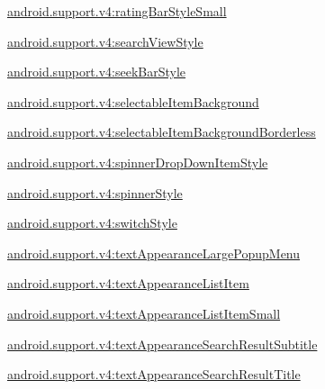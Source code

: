 {\ttfamily \hyperlink{classandroid_1_1support_1_1v4_1_1R_1_1styleable_a82003426a43aa180e41d2b25450047c9}{android.\+support.\+v4\+:rating\+Bar\+Style\+Small}}

{\ttfamily \hyperlink{classandroid_1_1support_1_1v4_1_1R_1_1styleable_ad107185a80adbb1be528d21aa3a5e644}{android.\+support.\+v4\+:search\+View\+Style}}

{\ttfamily \hyperlink{classandroid_1_1support_1_1v4_1_1R_1_1styleable_ac401ab56daa8fcd20c0beb0413d8813f}{android.\+support.\+v4\+:seek\+Bar\+Style}}

{\ttfamily \hyperlink{classandroid_1_1support_1_1v4_1_1R_1_1styleable_a3e75027080282e399085b17ac981b5be}{android.\+support.\+v4\+:selectable\+Item\+Background}}

{\ttfamily \hyperlink{classandroid_1_1support_1_1v4_1_1R_1_1styleable_aabd8d4f3de97874973f63a4e93a5fd9a}{android.\+support.\+v4\+:selectable\+Item\+Background\+Borderless}}

{\ttfamily \hyperlink{classandroid_1_1support_1_1v4_1_1R_1_1styleable_a0aa97271d74700457071ff210723f1c6}{android.\+support.\+v4\+:spinner\+Drop\+Down\+Item\+Style}}

{\ttfamily \hyperlink{classandroid_1_1support_1_1v4_1_1R_1_1styleable_aeba225a2c69936da0d94609f5e139e48}{android.\+support.\+v4\+:spinner\+Style}}

{\ttfamily \hyperlink{classandroid_1_1support_1_1v4_1_1R_1_1styleable_a88c6ebdb5e64556c13f05c1525c8ef99}{android.\+support.\+v4\+:switch\+Style}}

{\ttfamily \hyperlink{classandroid_1_1support_1_1v4_1_1R_1_1styleable_a946d0cdb84dc252db74ba6bd92a139c3}{android.\+support.\+v4\+:text\+Appearance\+Large\+Popup\+Menu}}

{\ttfamily \hyperlink{classandroid_1_1support_1_1v4_1_1R_1_1styleable_afb0912c36e3e09d6a8e93507b65bf499}{android.\+support.\+v4\+:text\+Appearance\+List\+Item}}

{\ttfamily \hyperlink{classandroid_1_1support_1_1v4_1_1R_1_1styleable_a7130801a509563566260e6edc992a049}{android.\+support.\+v4\+:text\+Appearance\+List\+Item\+Small}}

{\ttfamily \hyperlink{classandroid_1_1support_1_1v4_1_1R_1_1styleable_aa2cece194eee07266ff9a9a5dd1bf22b}{android.\+support.\+v4\+:text\+Appearance\+Search\+Result\+Subtitle}}

{\ttfamily \hyperlink{classandroid_1_1support_1_1v4_1_1R_1_1styleable_aa8c47e569f9386614f689cf93446e929}{android.\+support.\+v4\+:text\+Appearance\+Search\+Result\+Title}}


